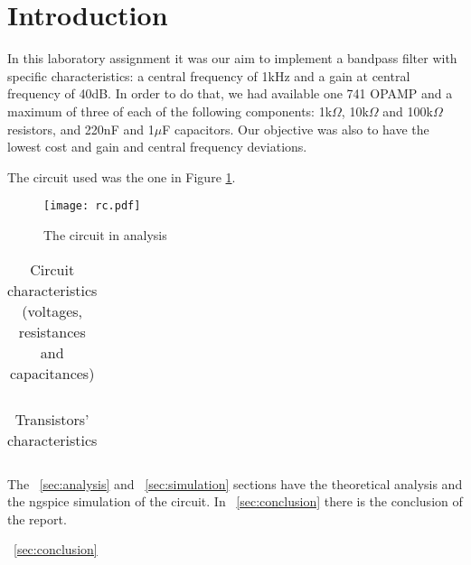 \section{Introduction}
\label {sec:introduction}


In this laboratory assignment it was our aim to implement a bandpass filter with specific characteristics: a central frequency of 1kHz and a gain at central frequency of 40dB. In order to do that, we had available one 741 OPAMP and a maximum of three of each of the following components: 1k$\Omega$, 10k$\Omega$ and 100k$\Omega$ resistors, and 220nF and 1$\mu$F capacitors. Our objective was also to have the lowest cost and gain and central frequency deviations.

The circuit used was the one in Figure \ref{fig:circuit}.


\begin{figure}[H] \centering
\texttt{[image: rc.pdf]}
\caption{The circuit in analysis}
\label{fig:circuit}
\end{figure}


\begin{table}[H]
  \centering
  \begin{tabular}{|c|c|}
    \hline
  \end{tabular}
  \caption{Circuit characteristics (voltages, resistances and capacitances)}
  \label{tab:resistance}
\end{table}

\begin{table}[H]
  \centering
  \begin{tabular}{|c|c|}
    \hline
  \end{tabular}
  \caption{Transistors' characteristics}
  \label{tab:resistance1}
\end{table}

The ~\ref{sec:analysis} and ~\ref{sec:simulation} sections have the theoretical analysis and the ngspice simulation of the circuit. In ~\ref{sec:conclusion} there is the conclusion of the report.


~\ref{sec:conclusion}
